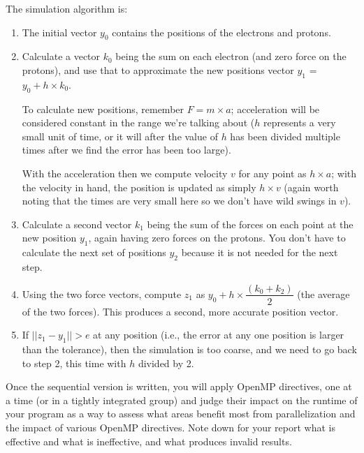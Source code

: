 \documentclass[letterpaper,10pt]{article}
\begin{document}
The simulation algorithm is:

\begin{enumerate}
\item The initial vector $y_{0}$ contains the positions of the electrons and protons.

\item Calculate a vector $k_{0}$ being the sum on each electron (and zero force on the protons), and use that to approximate the new positions vector $y_{1}$ = $y_{0} + h \times k_{0}$.

To calculate new positions, remember $F = m \times a$;  acceleration will be considered constant in the range we're talking about ($h$ represents a very small unit of time, or it will after the value of $h$ has been divided multiple times after we find the error has been too large). 

With the acceleration then we compute velocity $v$ for any point as $h \times a$; with the velocity in hand, the position is updated as simply $h \times v$ (again worth noting that the times are very small here so we don't have wild swings in $v$). 

\item Calculate a second vector $k_{1}$ being the sum of the forces on each point at the new position $y_{1}$, again having zero forces on the protons. You don't have to calculate the next set of positions $y_{2}$ because it is not needed for the next step.

\item Using the two force vectors,  compute $z_{1}$ as $y_{0} + h \times \dfrac{( k_{0} + k_{2} )}{2}$ (the average of the two forces). This produces a second, more accurate position vector.

\item If $||z_{1} - y_{1}|| > e$ at any position (i.e., the error at any one position is larger than the tolerance), then the simulation is too coarse, and we need to go back to step 2, this time with $h$ divided by 2.

\end{enumerate}

Once the sequential version is written, you will apply OpenMP directives, one at a time (or in a tightly integrated group) and judge their impact on the runtime of your program as a way to assess what areas benefit most from parallelization and the impact of various OpenMP directives. Note down for your report what is effective and what is ineffective, and what produces invalid results. 
\end{document}
